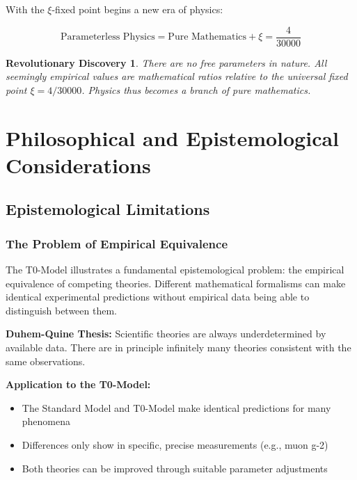 \documentclass[12pt,a4paper]{report}
\newtheorem{discovery}{Revolutionary Discovery}[chapter]
\begin{document}
	With the $\xi$-fixed point begins a new era of physics:
	
	\begin{equation}
		\boxed{\text{Parameterless Physics} = \text{Pure Mathematics} + \xi = \frac{4}{30000}}
	\end{equation}
	
	\begin{discovery}
		There are no free parameters in nature. All seemingly empirical values are mathematical ratios relative to the universal fixed point $\xi = 4/30000$. Physics thus becomes a branch of pure mathematics.
	\end{discovery}
	\chapter{Philosophical and Epistemological Considerations}\label{chap:philosophy}
	
	\section{Epistemological Limitations}\label{sec:epistemological_limitations}

\subsection{The Problem of Empirical Equivalence}\label{subsec:empirical_equivalence}

The T0-Model illustrates a fundamental epistemological problem: the empirical equivalence of competing theories. Different mathematical formalisms can make identical experimental predictions without empirical data being able to distinguish between them.

\textbf{Duhem-Quine Thesis:}
Scientific theories are always underdetermined by available data. There are in principle infinitely many theories consistent with the same observations.

\textbf{Application to the T0-Model:}
\begin{itemize}
	\item The Standard Model and T0-Model make identical predictions for many phenomena
	\item Differences only show in specific, precise measurements (e.g., muon g-2)
	\item Both theories can be improved through suitable parameter adjustments
\end{itemize}
\end{document}
